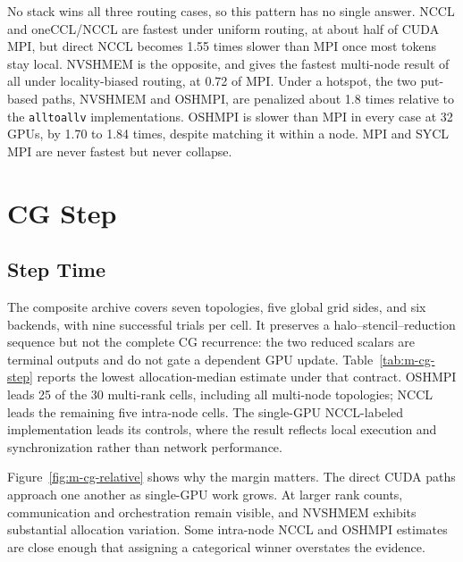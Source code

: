 \begin{keypoint}
No stack wins all three routing cases, so this pattern has no single answer. NCCL and oneCCL/NCCL are fastest under uniform routing, at about half of CUDA MPI, but direct NCCL becomes 1.55 times slower than MPI once most tokens stay local. NVSHMEM is the opposite, and gives the fastest multi-node result of all under locality-biased routing, at 0.72 of MPI. Under a hotspot, the two put-based paths, NVSHMEM and OSHMPI, are penalized about 1.8 times relative to the \texttt{alltoallv} implementations. OSHMPI is slower than MPI in every case at 32 GPUs, by 1.70 to 1.84 times, despite matching it within a node. MPI and SYCL MPI are never fastest but never collapse.
\end{keypoint}

\section{CG Step}\label{sec:cg-step-results}

\subsection{Step Time}

The composite archive covers seven topologies, five global grid sides, and six backends, with nine successful trials per cell. It preserves a halo--stencil--reduction sequence but not the complete CG recurrence: the two reduced scalars are terminal outputs and do not gate a dependent GPU update. Table~\ref{tab:m-cg-step} reports the lowest allocation-median estimate under that contract. OSHMPI leads 25 of the 30 multi-rank cells, including all multi-node topologies; NCCL leads the remaining five intra-node cells. The single-GPU NCCL-labeled implementation leads its controls, where the result reflects local execution and synchronization rather than network performance.

\begin{table}[htbp]
\centering
\caption{Lowest allocation-median \texttt{cg\_step} time by topology and global grid side. This is a point-estimate ranking for the synthetic sequence, not a significance test or a solver-ready ranking.}
\label{tab:m-cg-step}
\footnotesize

\end{table}

Figure~\ref{fig:m-cg-relative} shows why the margin matters. The direct CUDA paths approach one another as single-GPU work grows. At larger rank counts, communication and orchestration remain visible, and NVSHMEM exhibits substantial allocation variation. Some intra-node NCCL and OSHMPI estimates are close enough that assigning a categorical winner overstates the evidence.

